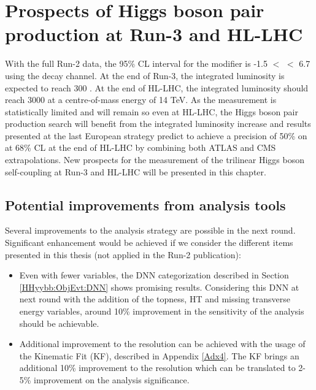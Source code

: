 \chapter{Prospects of Higgs boson pair production at Run-3 and HL-LHC}
\label{HL-LHC}

With the full Run-2 data, the 95\% CL interval for the \kl modifier is -1.5 $<$ \kl $<$ 6.7 using the \HHyybb decay channel. At the end of Run-3, the integrated luminosity is expected to reach 300 \ifb. At the end of HL-LHC, the integrated luminosity should reach 3000 \ifb at a centre-of-mass energy of 14 TeV. As the measurement is statistically limited and will remain so even at HL-LHC, the Higgs boson pair production search will benefit from the integrated luminosity increase and results presented at the last European strategy predict to achieve a precision of 50\% on \kl at 68\% CL at the end of HL-LHC \cite{Europ} by combining both ATLAS and CMS extrapolations. New prospects for the measurement of the trilinear Higgs boson self-coupling at Run-3 and HL-LHC will be presented in this chapter. 

\section{Potential \HHyybb improvements from analysis tools}
\label{HL-LHC:Run-3}

Several improvements to the \HHyybb analysis strategy are possible in the next round. Significant enhancement would be achieved if we consider the different items presented in this thesis (not applied in the Run-2 publication):
\begin{itemize}
    \item Even with fewer variables, the DNN categorization described in Section \ref{HHyybb:ObjEvt:DNN} shows promising results. Considering this DNN at next round with the addition of the topness, HT and missing transverse energy variables, around 10\% improvement in the sensitivity of the analysis should be achievable. 
    \item Additional improvement to the \mbb resolution can be achieved with the usage of the Kinematic Fit (KF), described in Appendix \ref{Adx4}. The KF brings an additional 10\% improvement to the \mbb resolution which can be translated to 2-5\% improvement on the analysis significance. 
\end{itemize}

